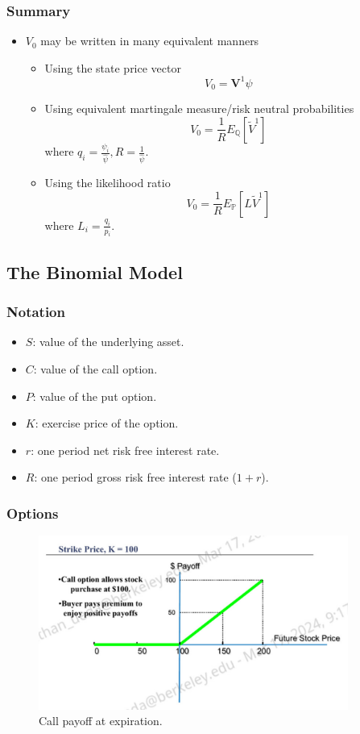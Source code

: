 \documentclass[11pt]{article}
\begin{document}
\subsubsection{Summary}

\begin{itemize}
    \item $V_0$ may be written in many equivalent manners 
    \begin{itemize}
        \item Using the state price vector 
        \[V_0 = \boldsymbol{V}^1 \psi\]
        \item Using equivalent martingale measure/risk neutral probabilities 
        \[V_0 = \frac{1}{R} E_{\mathbb{Q}}[\tilde{V}^1]\]
        where $q_i = \frac{\psi_i}{\hat{\psi}}, R = \frac{1}{\hat{\psi}}$.
        \item Using the likelihood ratio 
        \[V_0 = \frac{1}{R} E_{\mathbb{P}}[L\tilde{V}^1]\]
        where $L_i = \frac{q_i}{p_i}$.
    \end{itemize}
    
\end{itemize}

\subsection{The Binomial Model}

\subsubsection{Notation}
\begin{itemize}
    \item $S$: value of the underlying asset.
    \item $C$: value of the call option.
    \item $P$: value of the put option.
    \item $K$: exercise price of the option.
    \item $r$: one period net risk free interest rate.
    \item $R$: one period gross risk free interest rate ($1+r$).
\end{itemize}

\subsubsection{Options}

\begin{figure}[H] 
    \centering 
    \includegraphics[width=4in]{imgs/call_payoff.png}
    \caption{Call payoff at expiration.}
\end{figure}
\end{document}
